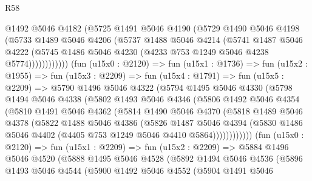 \begin{lexlean}{R58}
\begin{coremodule}
                  @1492
                  @5046
                  @4182
                  (@5725
                    @1491
                    @5046
                    @4190
                    (@5729
                      @1490
                      @5046
                      @4198
                      (@5733
                        @1489
                        @5046
                        @4206
                        (@5737
                          @1488
                          @5046
                          @4214
                          (@5741
                            @1487
                            @5046
                            @4222
                            (@5745 @1486 @5046 @4230 (@4233 @753 @1249 @5046 @4238 @5774))))))))))))
        (fun (u15x0 : @2120) =>
        fun (u15x1 : @1736) =>
        fun (u15x2 : @1955) =>
        fun (u15x3 : @2209) =>
        fun (u15x4 : @1791) =>
        fun (u15x5 : @2209) =>
        @5790
          @1496
          @5046
          @4322
          (@5794
            @1495
            @5046
            @4330
            (@5798
              @1494
              @5046
              @4338
              (@5802
                @1493
                @5046
                @4346
                (@5806
                  @1492
                  @5046
                  @4354
                  (@5810
                    @1491
                    @5046
                    @4362
                    (@5814
                      @1490
                      @5046
                      @4370
                      (@5818
                        @1489
                        @5046
                        @4378
                        (@5822
                          @1488
                          @5046
                          @4386
                          (@5826
                            @1487
                            @5046
                            @4394
                            (@5830 @1486 @5046 @4402 (@4405 @753 @1249 @5046 @4410 @5864))))))))))))
        (fun (u15x0 : @2120) =>
        fun (u15x1 : @2209) =>
        fun (u15x2 : @2209) =>
        @5884
          @1496
          @5046
          @4520
          (@5888
            @1495
            @5046
            @4528
            (@5892
              @1494
              @5046
              @4536
              (@5896
                @1493
                @5046
                @4544
                (@5900
                  @1492
                  @5046
                  @4552
                  (@5904
                    @1491
                    @5046

\end{coremodule}
\end{lexlean}
